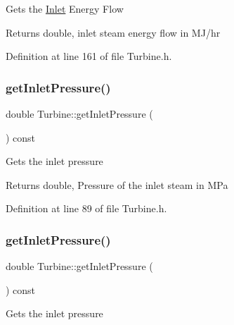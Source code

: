 Gets the \hyperlink{class_inlet}{Inlet} Energy Flow

\begin{DoxyReturn}{Returns}
double, inlet steam energy flow in M\+J/hr 
\end{DoxyReturn}


Definition at line 161 of file Turbine.\+h.

\mbox{\label{class_turbine_a148ad3877851f1c3931d8a6771d750c5}} 
\subsubsection{\texorpdfstring{get\+Inlet\+Pressure()}{getInletPressure()}\hspace{0.1cm}{\footnotesize\ttfamily [1/3]}}
{\footnotesize\ttfamily double Turbine\+::get\+Inlet\+Pressure (\begin{DoxyParamCaption}{ }\end{DoxyParamCaption}) const\hspace{0.3cm}{\ttfamily [inline]}}

Gets the inlet pressure

\begin{DoxyReturn}{Returns}
double, Pressure of the inlet steam in M\+Pa 
\end{DoxyReturn}


Definition at line 89 of file Turbine.\+h.

\mbox{\label{class_turbine_a148ad3877851f1c3931d8a6771d750c5}} 
\subsubsection{\texorpdfstring{get\+Inlet\+Pressure()}{getInletPressure()}\hspace{0.1cm}{\footnotesize\ttfamily [2/3]}}
{\footnotesize\ttfamily double Turbine\+::get\+Inlet\+Pressure (\begin{DoxyParamCaption}{ }\end{DoxyParamCaption}) const\hspace{0.3cm}{\ttfamily [inline]}}

Gets the inlet pressure

